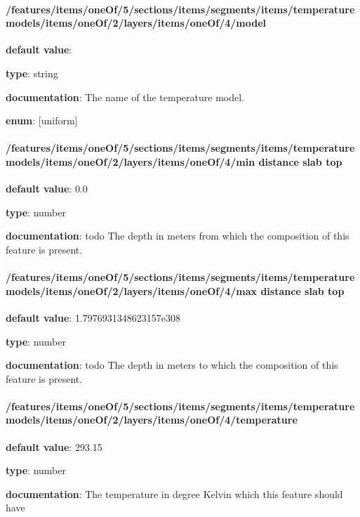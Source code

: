 \paragraph{/features/items/oneOf/5/sections/items/segments/items/temperature models/items/oneOf/2/layers/items/oneOf/4/model} \begin{itemized}
\item {\bf default value}: 
\item {\bf type}: string
\item {\bf documentation}: The name of the temperature model.
\item {\bf enum}: [uniform]\end{itemized}\paragraph{/features/items/oneOf/5/sections/items/segments/items/temperature models/items/oneOf/2/layers/items/oneOf/4/min distance slab top} \begin{itemized}
\item {\bf default value}: 0.0
\item {\bf type}: number
\item {\bf documentation}: todo The depth in meters from which the composition of this feature is present.
\end{itemized}\paragraph{/features/items/oneOf/5/sections/items/segments/items/temperature models/items/oneOf/2/layers/items/oneOf/4/max distance slab top} \begin{itemized}
\item {\bf default value}: 1.7976931348623157e308
\item {\bf type}: number
\item {\bf documentation}: todo The depth in meters to which the composition of this feature is present.
\end{itemized}\paragraph{/features/items/oneOf/5/sections/items/segments/items/temperature models/items/oneOf/2/layers/items/oneOf/4/temperature} \begin{itemized}
\item {\bf default value}: 293.15
\item {\bf type}: number
\item {\bf documentation}: The temperature in degree Kelvin which this feature should have

\end{itemized}
